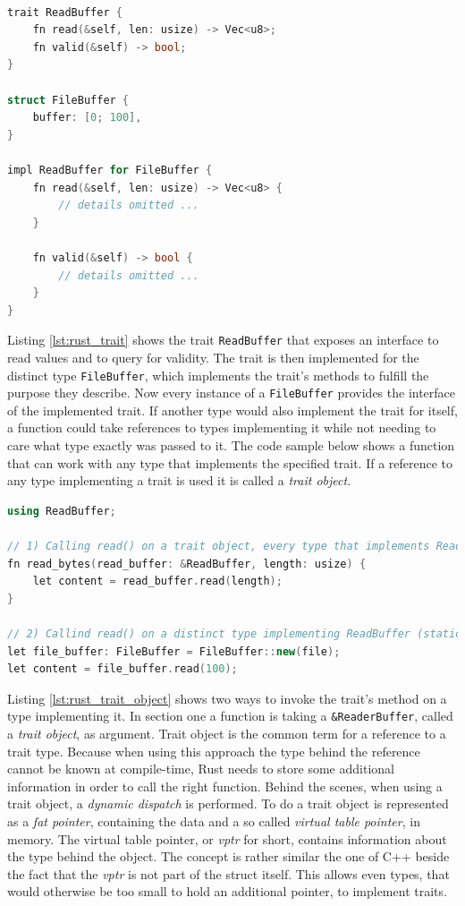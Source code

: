 \begin{lstlisting}[caption={Example usage of a trait and a type implementing it}, label={lst:rust_trait}, language=C++]

trait ReadBuffer {
	fn read(&self, len: usize) -> Vec<u8>;
	fn valid(&self) -> bool; 
}

struct FileBuffer {
	buffer: [0; 100],
}

impl ReadBuffer for FileBuffer {
	fn read(&self, len: usize) -> Vec<u8> {
		// details omitted ...
	}
	
	fn valid(&self) -> bool {
		// details omitted ...
	}
}
\end{lstlisting}

\noindent
Listing \ref{lst:rust_trait} shows the trait \texttt{ReadBuffer} that exposes an interface to read values and to query for validity. The trait is then implemented for the distinct type \texttt{FileBuffer}, which implements the trait's methods to fulfill the purpose they describe. Now every instance of a \texttt{FileBuffer} provides the interface of the implemented trait. If another type would also implement the trait for itself, a function could take references to types implementing it while not needing to care what type exactly was passed to it. The code sample below shows a function that can work with any type that implements the specified trait. If a reference to any type implementing a trait is used it is called a \textit{trait object}.\\

\begin{lstlisting}[caption={A function, taking a trait object}, label={lst:rust_trait_object}, language=C++]
using ReadBuffer;

// 1) Calling read() on a trait object, every type that implements ReadBuffer (dynamic dispatch)
fn read_bytes(read_buffer: &ReadBuffer, length: usize) {
	let content = read_buffer.read(length);
}

// 2) Callind read() on a distinct type implementing ReadBuffer (static dispatch)
let file_buffer: FileBuffer = FileBuffer::new(file);
let content = file_buffer.read(100);
\end{lstlisting}

\noindent
Listing \ref{lst:rust_trait_object} shows two ways to invoke the trait's method on a type implementing it. In section one a function is taking a \texttt{\&ReaderBuffer}, called a \textit{trait object}, as argument. Trait object is the common term for a reference to a trait type. Because when using this approach the type behind the reference cannot be known at compile-time, Rust needs to store some additional information in order to call the right function. Behind the scenes, when using a trait object, a \textit{dynamic dispatch} is performed. To do a trait object is represented as a \textit{fat pointer}, containing the data and a so called \textit{virtual table pointer}, in memory. The virtual table pointer, or \textit{vptr} for short, contains information about the type behind the object. The concept is rather similar the one of C++ beside the fact that the \textit{vptr} is not part of the struct itself. This allows even types, that would otherwise be too small to hold an additional pointer, to implement traits.\\

